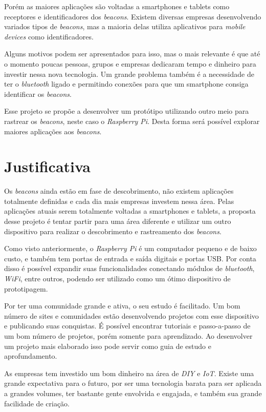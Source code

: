 \documentclass[
	12pt,				%
	openright,			%
	oneside,			%
	a4paper,			%
	chapter=TITLE,		%
	english,			%
	french,				%
	spanish,			%
	brazil				%
	]{abntex2}
\begin{document}
{Porém as maiores aplicações são voltadas a smartphones e tablets como receptores e identificadores dos \textit{beacons}. Existem diversas empresas desenvolvendo variados tipos de \textit{beacons}, mas a maioria delas utiliza aplicativos para \textit{mobile devices} como identificadores. 

Alguns motivos podem ser apresentados para isso, mas o mais relevante é que até o momento poucas pessoas, grupos e empresas dedicaram tempo e dinheiro para investir nessa nova tecnologia. Um grande problema também é a necessidade de ter o \textit{bluetooth} ligado e permitindo conexões para que um smartphone consiga identificar os \textit{beacons}.

Esse projeto se propõe a desenvolver um protótipo utilizando outro meio para rastrear os \textit{beacons}, neste caso o \textit{Raspberry Pi}. Desta forma será possível explorar maiores aplicações aos \textit{beacons}.




\chapter{Justificativa}

Os \textit{beacons} ainda estão em fase de descobrimento, não existem aplicações totalmente definidas e cada dia mais empresas investem nessa área. Pelas aplicações atuais serem totalmente voltadas a smartphones e tablets, a proposta desse projeto é tentar partir para uma área diferente e utilizar um outro dispositivo para realizar o descobrimento e rastreamento dos \textit{beacons}.

Como visto anteriormente, o \textit{Raspberry Pi} é um computador pequeno e de baixo custo, e também tem portas de entrada e saída digitais e portas USB. Por conta disso é possível expandir suas funcionalidades conectando módulos de \textit{bluetooth}, \textit{WiFi}, entre outros, podendo ser utilizado como um ótimo dispositivo de prototipagem.

Por ter uma comunidade grande e ativa, o seu estudo é facilitado. Um bom número de sites e comunidades estão desenvolvendo projetos com esse dispositivo e publicando suas conquistas. É possível encontrar tutoriais e passo-a-passo de um bom número de projetos, porém somente para aprendizado. Ao desenvolver um projeto mais elaborado isso pode servir como guia de estudo e aprofundamento.

As empresas tem investido um bom dinheiro na área de \textit{DIY} e \textit{IoT}. Existe uma grande expectativa para o futuro, por ser uma tecnologia barata para ser aplicada a grandes volumes, ter bastante gente envolvida e engajada, e também sua grande facilidade de criação.



}
\end{document}
